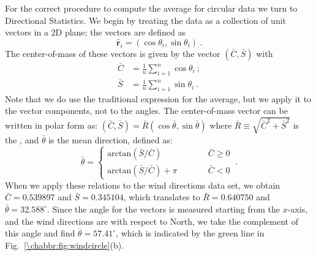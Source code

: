 For the correct procedure to compute the average for circular data we turn to Directional Statistics. We begin by treating the data as a collection of unit vectors in a 2D plane; the vectors are defined as
\[
	\hat{\mathbf{r}}_i = (\cos\theta_i,\sin\theta_i)\ .
\]
The center-of-mass of these vectors is given by the vector $(\bar{C},\bar{S})$ with 
\begin{equation*}
\begin{split}
	\bar{C} &= \frac{1}{n}\sum_{i=1}^n \cos\theta_i\ ;\\
	\bar{S} &= \frac{1}{n}\sum_{i=1}^n \sin\theta_i\ .	
\end{split}
\end{equation*}
Note that we do use the traditional expression for the average, but we apply it to the vector components, not to the angles.  The center-of-mass vector can be written in polar form as: $(\bar{C},\bar{S})=\bar{R}(\cos\bar{\theta},\sin\bar{\theta})$ where $\bar{R}\equiv \sqrt{\bar{C}^2+\bar{S}^2}$ is the , and $\bar{\theta}$ is the mean direction, defined as:
\begin{equation*}
	\bar{\theta} = \left\{\begin{array}{lcl}
	\text{arctan}(\bar{S}/\bar{C}) & \qquad & \bar{C}\ge 0\\
	\text{arctan}(\bar{S}/\bar{C})+\pi & \qquad & \bar{C}< 0\end{array}\right.\ .	
\end{equation*}
When we apply these relations to the wind directions data set, we obtain $\bar{C}=0.539897$ and $\bar{S}=0.345104$, which translates to $\bar{R}=0.640750$ and $\bar{\theta}=32.588^{\circ}$.  Since the angle for the vectors is measured starting from the $x$-axis, and the wind directions are with respect to North, we take the complement of this angle and find $\bar{\theta}=57.41^{\circ}$, which is indicated by the green line in  Fig.~\ref{\chabbr:fig:windcircle}(b).  

